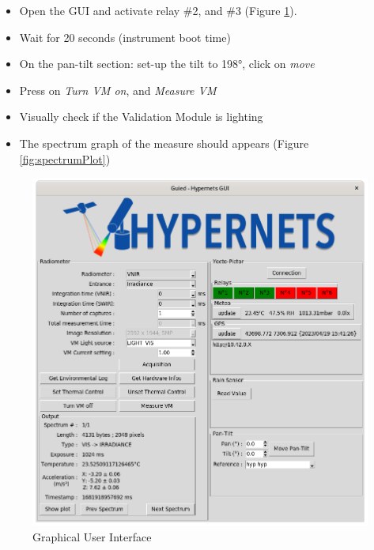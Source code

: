 \begin{itemize}
	\item Open the GUI and activate relay \#2, and \#3 (Figure
		\ref{fig:gui}).
	\item Wait for 20 seconds (instrument boot time)
	\item On the pan-tilt section: set-up the tilt to 198°, click on \textit{move}
	\item Press on \textit{Turn VM on}, and \textit{Measure VM}
	\item Visually check if the Validation Module is lighting
	\item The spectrum graph of the measure should appears (Figure
		\ref{fig:spectrumPlot})
\end{itemize}


\begin{figure}[!ht]
  \centering
  \begin{minipage}[b]{0.48\textwidth}
	  \includegraphics[width=\linewidth]{images/gui_main.png}
	  \vspace{11pt}
	\vspace{-15pt}
	  \caption{Graphical User Interface}
	\label{fig:gui}
  \end{minipage}
  \hfill
  \begin{minipage}[b]{0.48\textwidth}

\end{minipage}
\end{figure}
